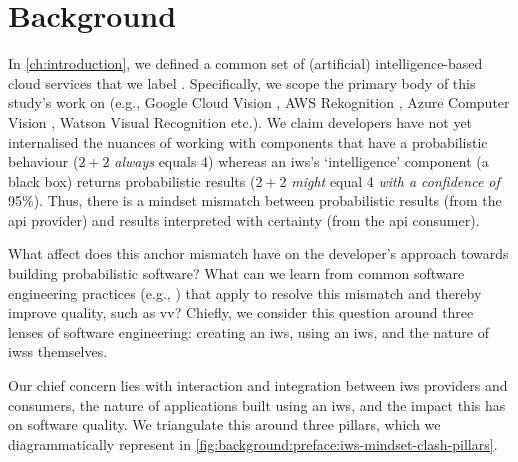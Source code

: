 \chapter{Background}
\label{ch:background}

\graphicspath{{mainmatter/background/figures/}}

\label{sec:background:preface}

In \cref{ch:introduction}, we defined a common set of (artificial) intelligence-based cloud services that we label . Specifically, we scope the primary body of this study's work on  (e.g., Google Cloud Vision , AWS Rekognition , Azure Computer Vision , Watson Visual Recognition  etc.). We claim developers have not yet internalised the nuances of working with components that have a probabilistic behaviour ($2+2$ \textit{always} equals 4) whereas an \gls{iws}'s `intelligence' component (a black box) returns probabilistic results ($2+2$ \textit{might} equal 4 \textit{with a confidence of} 95\%). Thus, there is a mindset mismatch between probabilistic results (from the \gls{api} provider) and results interpreted with certainty (from the \gls{api} consumer).

What affect does this anchor mismatch have on the developer's approach towards building probabilistic software? What can we learn from common software engineering practices (e.g., \citep{Pressman:2005vf,Sommerville:2011uc}) that apply to resolve this mismatch and thereby improve quality, such as \gls{vv}? Chiefly, we consider this question around three lenses of software engineering: creating an \gls{iws}, using an \gls{iws}, and the nature of \glspl{iws} themselves.

Our chief concern lies with interaction and integration between \gls{iws} providers and consumers, the nature of applications built using an \gls{iws}, and the impact this has on software quality. We triangulate this around three pillars, which we diagrammatically represent in \cref{fig:background:preface:iws-mindset-clash-pillars}.
 
